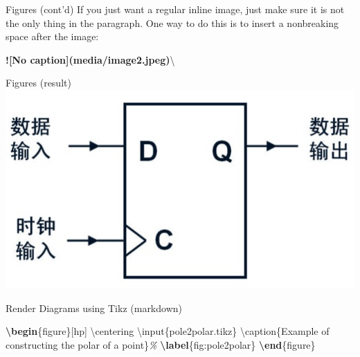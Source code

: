 \documentclass[
  10pt,
  ignorenonframetext,
  serif,onlymath]{beamer}
\newenvironment{Shaded}{}{}
\newcommand{\AlertTok}[1]{\textcolor[rgb]{1.00,0.00,0.00}{\textbf{#1}}}
\newcommand{\CommentTok}[1]{\textcolor[rgb]{0.38,0.63,0.69}{\textit{#1}}}
\newcommand{\ExtensionTok}[1]{#1}
\newcommand{\FunctionTok}[1]{\textcolor[rgb]{0.02,0.16,0.49}{#1}}
\newcommand{\KeywordTok}[1]{\textcolor[rgb]{0.00,0.44,0.13}{\textbf{#1}}}
\newcommand{\NormalTok}[1]{#1}
\begin{document}
\begin{frame}[fragile]{Figures (cont'd)}
\protect\hypertarget{figures-contd}{}
If you just want a regular inline image, just make sure it is not the
only thing in the paragraph. One way to do this is to insert a
nonbreaking space after the image:

\begin{Shaded}
\begin{Highlighting}[]
\AlertTok{![No caption](media/image2.jpeg)}\NormalTok{\textbackslash{}}
\end{Highlighting}
\end{Shaded}
\end{frame}

\begin{frame}{Figures (result)}
\protect\hypertarget{figures-result-1}{}
\includegraphics{media/image2.jpeg}\\
\end{frame}

\begin{frame}[fragile]{Render Diagrams using Tikz (markdown)}
\protect\hypertarget{render-diagrams-using-tikz-markdown}{}
\begin{Shaded}
\begin{Highlighting}[]
\KeywordTok{\textbackslash{}begin}\NormalTok{\{}\ExtensionTok{figure}\NormalTok{\}[hp]}
\FunctionTok{\textbackslash{}centering}
\FunctionTok{\textbackslash{}input}\NormalTok{\{pole2polar.tikz\}}
\FunctionTok{\textbackslash{}caption}\NormalTok{\{Example of constructing}
\NormalTok{    the polar of a point\}}\CommentTok{\%}
\KeywordTok{\textbackslash{}label}\NormalTok{\{}\ExtensionTok{fig:pole2polar}\NormalTok{\}}
\KeywordTok{\textbackslash{}end}\NormalTok{\{}\ExtensionTok{figure}\NormalTok{\}}
\end{Highlighting}
\end{Shaded}
\end{frame}
\end{document}
